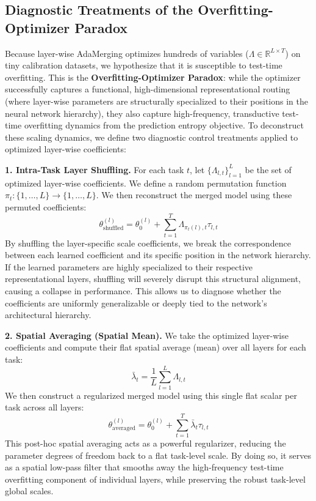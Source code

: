 \subsection{Diagnostic Treatments of the Overfitting-Optimizer Paradox}
Because layer-wise AdaMerging optimizes hundreds of variables ($\Lambda \in \mathbb{R}^{L \times T}$) on tiny calibration datasets, we hypothesize that it is susceptible to test-time overfitting. This is the \textbf{Overfitting-Optimizer Paradox}: while the optimizer successfully captures a functional, high-dimensional representational routing (where layer-wise parameters are structurally specialized to their positions in the neural network hierarchy), they also capture high-frequency, transductive test-time overfitting dynamics from the prediction entropy objective. To deconstruct these scaling dynamics, we define two diagnostic control treatments applied to optimized layer-wise coefficients:

\textbf{1. Intra-Task Layer Shuffling.}
For each task $t$, let $\{\Lambda_{l, t}\}_{l=1}^L$ be the set of optimized layer-wise coefficients. We define a random permutation function $\pi_t: \{1, \dots, L\} \rightarrow \{1, \dots, L\}$. We then reconstruct the merged model using these permuted coefficients:
\begin{equation}
\label{eq:shuffling}
\theta_{\text{shuffled}}^{(l)} = \theta_0^{(l)} + \sum_{t=1}^T \Lambda_{\pi_t(l), t} \tau_{l, t}
\end{equation}
By shuffling the layer-specific scale coefficients, we break the correspondence between each learned coefficient and its specific position in the network hierarchy. If the learned parameters are highly specialized to their respective representational layers, shuffling will severely disrupt this structural alignment, causing a collapse in performance. This allows us to diagnose whether the coefficients are uniformly generalizable or deeply tied to the network's architectural hierarchy.

\textbf{2. Spatial Averaging (Spatial Mean).}
We take the optimized layer-wise coefficients and compute their flat spatial average (mean) over all layers for each task:
\begin{equation}
\bar{\lambda}_t = \frac{1}{L} \sum_{l=1}^L \Lambda_{l, t}
\end{equation}
We then construct a regularized merged model using this single flat scalar per task across all layers:
\begin{equation}
\label{eq:averaging}
\theta_{\text{averaged}}^{(l)} = \theta_0^{(l)} + \sum_{t=1}^T \bar{\lambda}_t \tau_{l, t}
\end{equation}
This post-hoc spatial averaging acts as a powerful regularizer, reducing the parameter degrees of freedom back to a flat task-level scale. By doing so, it serves as a spatial low-pass filter that smooths away the high-frequency test-time overfitting component of individual layers, while preserving the robust task-level global scales.

